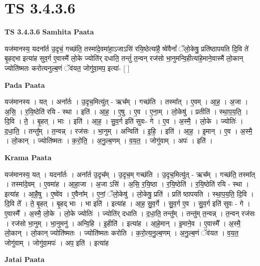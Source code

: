 \documentclass[17pt]{extarticle}
\begin{document}
\section{ TS 3.4.3.6 }

\textbf{TS 3.4.3.6 } \newline
\textbf{Samhita Paata} \newline

यज॑मानस्य॒ यदना᳚र्त उ॒दृचं॒ गच्छ॑ति॒ तस्मा॑दे॒वमा॑हा॒ऽजाऽसि॑ रयि॒ष्ठेत्या॑है॒ ष्वे॑वैनां᳚ ॅलो॒केषु॒ प्रति॑ष्ठापयति दि॒वि ते॑ बृ॒हद्भा इत्या॑ह सुव॒र्ग ए॒वास्मै॑ लो॒के ज्योति॑र् दधाति॒ तन्तुं॑ त॒न्वन् रज॑सो भा॒नुमन्वि॒हीत्या॑हे॒माने॒वास्मै॑ लो॒कान् ज्योति॑ष्मतः करोत्यनुल्ब॒णं ॅव॑यत॒ जोगु॑वा॒मप॒ इत्या॑-  [  ] \newline

\textbf{Pada Paata} \newline

यज॑मानस्य । यत् । अना᳚र्तः । उ॒दृच॒मित्यु॑त् - ऋच᳚म् । गच्छ॑ति । तस्मा᳚त् । ए॒वम् । आ॒ह॒ । अ॒जा । अ॒सि॒ । र॒यि॒ष्ठेति॑ रयि - स्था । इति॑ । आ॒ह॒ । ए॒षु । ए॒व । ए॒ना॒म् । लो॒केषु॑ । प्रतीति॑ । स्था॒प॒य॒ति॒ । दि॒वि । ते॒ । बृ॒हत् । भाः । इति॑ । आ॒ह॒ । सु॒व॒र्ग इति॑ सुवः- गे । ए॒व । अ॒स्मै॒ । लो॒के । ज्योतिः॑ । द॒धा॒ति॒ । तन्तु᳚म् । त॒न्वन्न् । रज॑सः । भा॒नुम् । अन्विति॑ । इ॒हि॒ । इति॑ । आ॒ह॒ । इ॒मान् । ए॒व । अ॒स्मै॒ । लो॒कान् । ज्योति॑ष्मतः । क॒रो॒ति॒ । अ॒नु॒ल्ब॒णम् । व॒य॒त॒ । जोगु॑वाम् । अपः॑ । इति॑ ।  \newline


\textbf{Krama Paata} \newline

यज॑मानस्य॒ यत् । यदना᳚र्तः । अना᳚र्त उ॒दृच᳚म् । उ॒दृच॒म् गच्छ॑ति । उ॒दृच॒मित्यु॑त् - ऋच᳚म् । गच्छ॑ति॒ तस्मा᳚त् । तस्मा॑दे॒वम् । ए॒वमा॑ह । आ॒हा॒जा । अ॒जा ऽसि॑ । अ॒सि॒ र॒यि॒ष्ठा । र॒यि॒ष्ठेति॑ । र॒यि॒ष्ठेति॑ रयि - स्था । इत्या॑ह । आ॒है॒षु । ए॒ष्वे॑व । ए॒वैना᳚म् । ए॒नां॒ ॅलो॒केषु॑ । लो॒केषु॒ प्रति॑ । प्रति॑ ष्ठापयति । स्था॒प॒य॒ति॒ दि॒वि । दि॒वि ते᳚ । ते॒ बृ॒हत् । बृ॒हद् भाः । भा इति॑ । इत्या॑ह । आ॒ह॒ सु॒व॒र्गे । सु॒व॒र्ग ए॒व । सु॒व॒र्ग इति॑ सुवः - गे । ए॒वास्मै᳚ । अ॒स्मै॒ लो॒के । लो॒के ज्योतिः॑ । ज्योति॑र् दधाति । द॒धा॒ति॒ तन्तु᳚म् । तन्तु॑म् त॒न्वन्न् । त॒न्वन् रज॑सः । रज॑सो भा॒नुम् । भा॒नुमनु॑ । अन्वि॒हि । इ॒हीति॑ । इत्या॑ह । आ॒हे॒मान् । इ॒माने॒व । ए॒वास्मै᳚ । अ॒स्मै॒ लो॒कान् । लो॒कान् ज्योति॑ष्मतः । ज्योति॑ष्मतः करोति । क॒रो॒त्य॒नु॒ल्ब॒णम् । अ॒नु॒ल्ब॒णं ॅव॑यत । व॒य॒त॒ जोगु॑वाम् । जोगु॑वा॒मपः॑ । अप॒ इति॑ । इत्या॑ह \newline

\textbf{Jatai Paata} \newline
\end{document}
